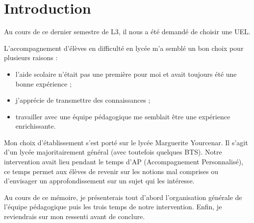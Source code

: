 \section{Introduction}

Au cours de ce dernier semestre de L3, il nous a été demandé de choisir une UEL.

L'accompagnement d'élèves en difficulté en lycée m'a semblé un bon choix pour plusieurs raisons :

\begin{itemize}
    \item l'aide scolaire n'était pas une première pour moi et avait toujours été une bonne expérience ;
    \item j'apprécie de transmettre des connaissances ;
    \item travailler avec une équipe pédagogique me semblait être une expérience enrichissante.
\end{itemize}

Mon choix d'établissement s'est porté sur le lycée Marguerite Yourcenar. Il s'agit d'un lycée majoritairement général
(avec toutefois quelques BTS). Notre intervention avait lieu pendant le temps d'AP (Accompagnement Personnalisé), ce
temps permet aux élèves de revenir sur les notions mal comprises ou d'envisager un approfondissement sur un sujet qui
les intéresse.

Au cours de ce mémoire, je présenterais tout d'abord l'organisation générale de l'équipe pédagogique puis les trois
temps de notre intervention. Enfin, je reviendrais sur mon ressenti avant de conclure.
